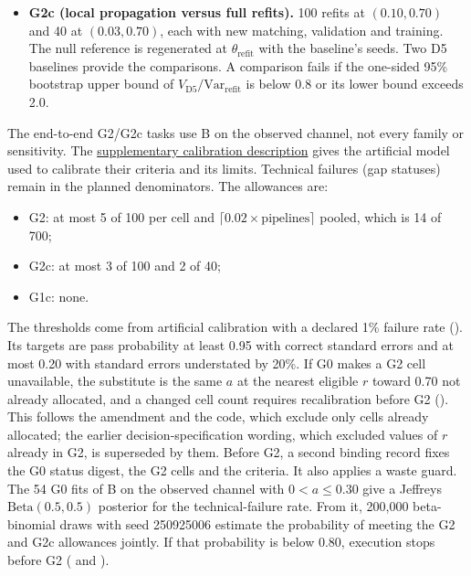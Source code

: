 \begin{itemize}
\item \textbf{G2c (local propagation versus full refits).} 100 refits at $(0.10,0.70)$ and 40 at $(0.03,0.70)$, each with new matching, validation and training. The null reference is regenerated at $\theta_{\mathrm{refit}}$ with the baseline's seeds. Two D5 baselines provide the comparisons. A comparison fails if the one-sided 95\% bootstrap upper bound of $V_{\mathrm{D5}}/\mathrm{Var}_{\mathrm{refit}}$ is below 0.8 or its lower bound exceeds 2.0.
\end{itemize}
The end-to-end G2/G2c tasks use B on the observed channel, not every family or sensitivity. The \hyperref[supp:gate-calibration]{supplementary calibration description} gives the artificial model used to calibrate their criteria and its limits. %
Technical failures (gap statuses) remain in the planned denominators. The allowances are:
\begin{itemize}
\item G2: at most 5 of 100 per cell and $\lceil0.02\times\text{pipelines}\rceil$ pooled, which is 14 of 700;
\item G2c: at most 3 of 100 and 2 of 40;
\item G1c: none.
\end{itemize}
The thresholds come from artificial calibration with a declared 1\% failure rate (). Its targets are pass probability at least 0.95 with correct standard errors and at most 0.20 with standard errors understated by 20\%. If G0 makes a G2 cell unavailable, the substitute is the same $a$ at the nearest eligible $r$ toward 0.70 not already allocated, and a changed cell count requires recalibration before G2 (). This follows the amendment and the code, which exclude only cells already allocated; the earlier decision-specification wording, which excluded values of $r$ already in G2, is superseded by them. Before G2, a second binding record fixes the G0 status digest, the G2 cells and the criteria. It also applies a waste guard. The 54 G0 fits of B on the observed channel with $0<a\le0.30$ give a Jeffreys $\mathrm{Beta}(0.5,0.5)$ posterior for the technical-failure rate. From it, 200,000 beta-binomial draws with seed 250925006 estimate the probability of meeting the G2 and G2c allowances jointly. If that probability is below 0.80, execution stops before G2 ( and ).

